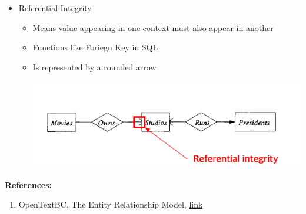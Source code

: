 \documentclass[12pt]{article}
\begin{document}
\begin{enumerate}[1.]
\begin{enumerate}[a)]
\begin{itemize}
            \item Referential Integrity

            \begin{itemize}
                \item Means value appearing in one context must also appear in
                another
                \item Functions like Foriegn Key in SQL
                \item Is represented by a rounded arrow

                \begin{center}
                \includegraphics[width=0.7\linewidth]{images/worksheet_14_solution_45.png}
                \end{center}
            \end{itemize}
        \end{itemize}

        \bigskip

        \underline{\textbf{References:}}

        \bigskip

        \begin{enumerate}[1)]
            \item OpenTextBC, The Entity Relationship Model, \href{https://opentextbc.ca/dbdesign01/chapter/chapter-8-entity-relationship-model/}{link}
        \end{enumerate}
    \end{enumerate}

\end{enumerate}
\end{document}
